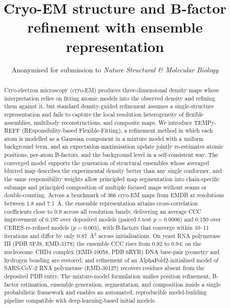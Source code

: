 \documentclass[11pt]{article}
\title{Cryo-EM structure and B-factor refinement with ensemble representation}
\author{Anonymised for submission to \emph{Nature Structural \& Molecular Biology}}
\date{}
\begin{document}
\maketitle

\begin{abstract}
Cryo-electron microscopy (cryo-EM) produces three-dimensional density maps whose
interpretation relies on fitting atomic models into the observed density and
refining them against it, but standard density-guided refinement assumes a
single-structure representation and fails to capture the local resolution
heterogeneity of flexible assemblies, multibody reconstructions, and composite
maps. We introduce TEMPy-REFF (REsponsibility-based Flexible-Fitting), a
refinement method in which each atom is modelled as a Gaussian component in a
mixture model with a uniform background term, and an expectation-maximisation
update jointly re-estimates atomic positions, per-atom B-factors, and the
background level in a self-consistent way. The converged model supports the
generation of structural ensembles whose averaged blurred map describes the
experimental density better than any single conformer, and the same
responsibility weights allow principled map segmentation into chain-specific
submaps and principled composition of multiple focused maps without seams or
double-counting. Across a benchmark of 366 cryo-EM maps from EMDB at
resolutions between 1.8 and 7.1~\AA, the ensemble representation attains
cross-correlation coefficients close to 0.9 across all resolution bands,
delivering an average CCC improvement of 0.197 over deposited models
(paired $t$-test $p=0.0006$) and 0.150 over CERES-re-refined models
($p=0.003$), with B-factors that converge within 10--11 iterations and differ
by only 0.87~\AA$^{2}$ across initialisations. On yeast RNA polymerase III
(PDB 5FJ8, EMD-3178) the ensemble CCC rises from 0.82 to 0.94; on the
nucleosome--CHD4 complex (EMD-10058, PDB 6RYR) DNA base-pair geometry and
hydrogen bonding are restored; and refinement of an AlphaFold2-initialised
model of SARS-CoV-2 RNA polymerase (EMD-30127) recovers residues absent from
the deposited PDB entry. The mixture-model formulation unifies position
refinement, B-factor estimation, ensemble generation, segmentation, and
composition inside a single probabilistic framework and enables an automated,
reproducible model-building pipeline compatible with deep-learning-based
initial models.
\end{abstract}
\end{document}
